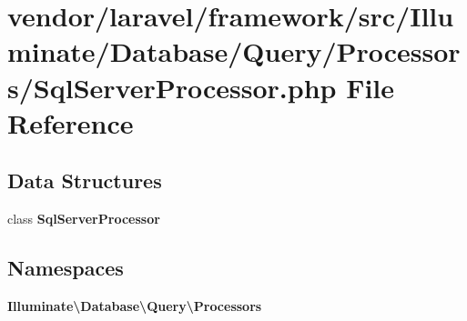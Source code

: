 \section{vendor/laravel/framework/src/\+Illuminate/\+Database/\+Query/\+Processors/\+Sql\+Server\+Processor.php File Reference}
\label{_sql_server_processor_8php}
\subsection*{Data Structures}
\begin{DoxyCompactItemize}
\item 
class {\bf Sql\+Server\+Processor}
\end{DoxyCompactItemize}
\subsection*{Namespaces}
\begin{DoxyCompactItemize}
\item 
 {\bf Illuminate\textbackslash{}\+Database\textbackslash{}\+Query\textbackslash{}\+Processors}
\end{DoxyCompactItemize}
